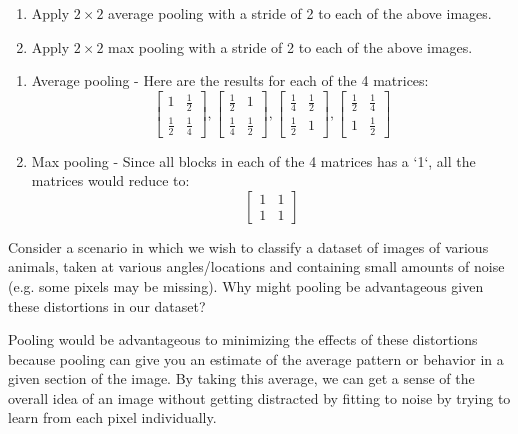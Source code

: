 \begin{enumerate}
    \item Apply $2 \times 2$ average pooling with a stride of 2 to each of the above images.
    \item Apply $2 \times 2$ max pooling with a stride of 2 to each of the above images.
\end{enumerate}

\begin{subsolution}
\begin{enumerate}
    \item Average pooling - Here are the results for each of the 4 matrices:
    $$
    \begin{bmatrix}
        1 & \frac{1}{2} \\
        \frac{1}{2} & \frac{1}{4}
    \end{bmatrix},
    \begin{bmatrix}
      \frac{1}{2} & 1 \\
      \frac{1}{4} & \frac{1}{2}
    \end{bmatrix},
    \begin{bmatrix}
      \frac{1}{4} & \frac{1}{2} \\
      \frac{1}{2} & 1
    \end{bmatrix},
    \begin{bmatrix}
      \frac{1}{2} & \frac{1}{4} \\
      1 & \frac{1}{2}
    \end{bmatrix}
    $$

    \item Max pooling - Since all blocks in each of the 4 matrices has a `1`, all the matrices would reduce to:
    $$
    \begin{bmatrix}
      1 & 1 \\
      1 & 1
    \end{bmatrix}
    $$
\end{enumerate}
\end{subsolution}


\problem[4]

Consider a scenario in which we wish to classify a dataset of images of various animals, taken at various angles/locations and containing small amounts of noise (e.g. some pixels may be missing). Why might pooling be advantageous given these distortions in our dataset?

\begin{subsolution}
  Pooling would be advantageous to minimizing the effects of these distortions because pooling can give you an estimate of the average pattern or behavior in a given section of the image. By taking this average, we can get a sense of the overall idea of an image without getting distracted by fitting to noise by trying to learn from each pixel individually.
\end{subsolution}

